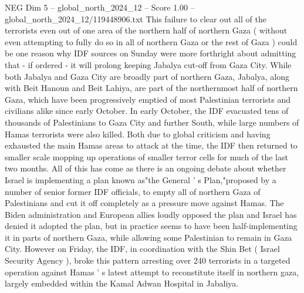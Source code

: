 \begin{textsample}{NEG Dim 5 – global\_north\_2024\_12 – Score 1.00 – global\_north\_2024\_12/119448906.txt}
This failure to clear out all of the terrorists even out of one area of the northern half of northern Gaza ( without even attempting to fully do so in all of northern Gaza or the rest of Gaza ) could be one reason why IDF sources on Sunday were more forthright about admitting that - if ordered - it will prolong keeping Jabalya cut-off from Gaza City.
While both Jabalya and Gaza City are broadly part of northern Gaza, Jabalya, along with Beit Hanoun and Beit Lahiya, are part of the northernmost half of northern Gaza, which have been progressively emptied of most Palestinian terrorists and civilians alike since early October.
In early October, the IDF evacuated tens of thousands of Palestinians to Gaza City and further South, while large numbers of Hamas terrorists were also killed.
Both due to global criticism and having exhausted the main Hamas areas to attack at the time, the IDF then returned to smaller scale mopping up operations of smaller terror cells for much of the last two months.
All of this has come as there is an ongoing debate about whether Israel is implementing a plan known as"the General ' s Plan,"proposed by a number of senior former IDF officials, to empty all of northern Gaza of Palestinians and cut it off completely as a pressure move against Hamas.
The Biden administration and European allies loudly opposed the plan and Israel has denied it adopted the plan, but in practice seems to have been half-implementing it in parts of northern Gaza, while allowing some Palestinian to remain in Gaza City.
However on Friday, the IDF, in coordination with the Shin Bet ( Israel Security Agency ), broke this pattern arresting over 240 terrorists in a targeted operation against Hamas ' s latest attempt to reconstitute itself in northern gaza, largely embedded within the Kamal Adwan Hospital in Jabaliya.

\end{textsample}
